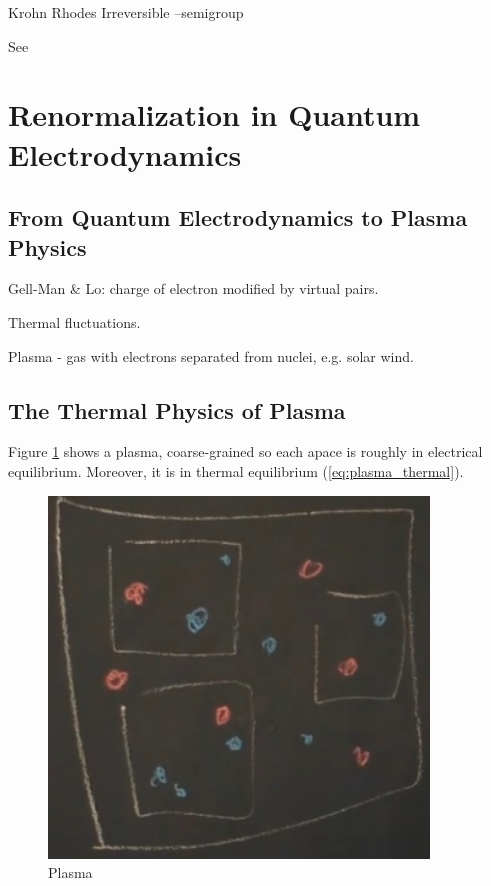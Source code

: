 \documentclass[]{article}
\begin{document}
Krohn Rhodes Irreversible --semigroup

See \cite{dedeo2011effective,maler2010krohn,rhodes2009applications}
\section{Renormalization in Quantum Electrodynamics}
\subsection{From Quantum Electrodynamics to Plasma Physics }

Gell-Man \& Lo: charge of electron modified by virtual pairs. 

Thermal fluctuations.

Plasma - gas with electrons separated from nuclei, e.g. solar wind.

\subsection{The Thermal Physics of Plasma}

Figure \ref{fig:plasma} shows a plasma, coarse-grained so each apace is roughly in electrical equilibrium. Moreover, it is in thermal equilibrium (\ref{eq:plasma_thermal}).
\begin{figure}[H]
	\caption{Plasma}\label{fig:plasma}
	\includegraphics[width=0.9\textwidth]{plasma}
\end{figure}
\end{document}
